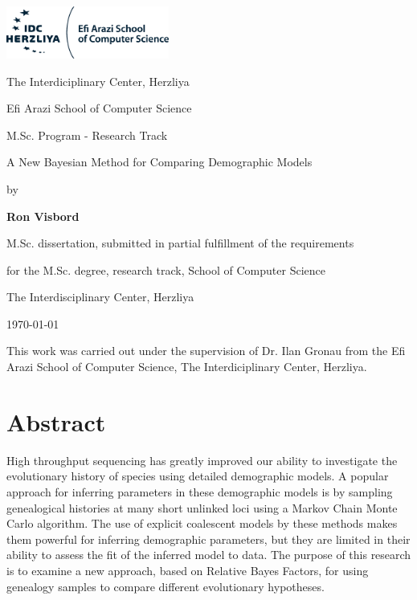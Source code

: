 \documentclass[11pt]{article}
\author{Ron Visbord}
\newcommand{\1}{\mathbbm{1}}
\begin{document}
\begin{titlepage}
	\centering
	\includegraphics[width=0.4\textwidth]{IDC_logo}\par\vspace{2cm}
	{\huge The Interdiciplinary Center, Herzliya \par}
	{\Large Efi Arazi School of Computer Science \par}
	{\Large M.Sc. Program - Research Track \par}
	
	\vspace{1cm}
	
	\vspace{1.5cm}
	{\Huge A New Bayesian Method for Comparing Demographic Models \par}
	\vspace{3cm}
	{\large by\par}
	{\large\bfseries Ron Visbord\par}
	
	\vspace{2cm}
	{M.Sc. dissertation, submitted in partial fulfillment of the requirements\par}
	{for the M.Sc. degree, research track, School of Computer Science\par}
	{The Interdisciplinary Center, Herzliya}
	
	\vfill
	
	{\large \monthyeardate\today \par}
	
\end{titlepage}

\newpage

This work was carried out under the supervision of Dr. Ilan Gronau from the Efi Arazi School of Computer Science, The Interdiciplinary Center, Herzliya.

\newpage

\section*{Abstract}
High throughput sequencing has greatly improved our ability to investigate the evolutionary history of species using detailed demographic models. A popular approach for inferring parameters in these demographic models is by sampling genealogical histories at many short unlinked loci using a Markov Chain Monte Carlo algorithm. The use of explicit coalescent models by these methods makes them powerful for inferring demographic parameters, but they are limited in their ability to assess the fit of the inferred model to data. The purpose of this research is to examine a new approach, based on Relative Bayes Factors, for using genealogy samples to compare different evolutionary hypotheses. 
\end{document}
